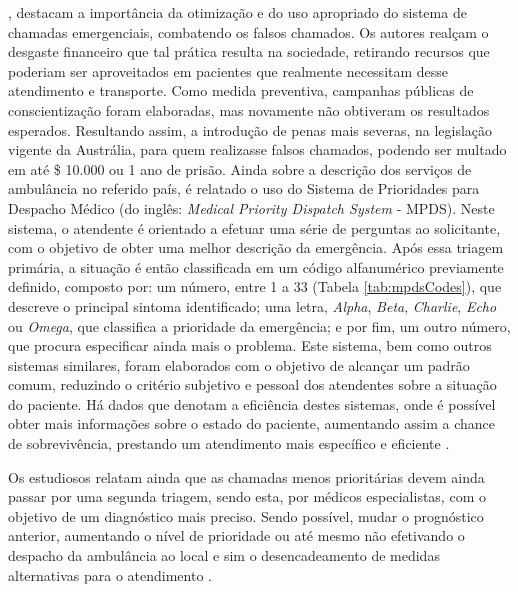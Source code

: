 \cite{rashford2010optimizing}, destacam a importância da otimização e do uso apropriado do sistema de chamadas emergenciais, combatendo os falsos chamados. Os autores realçam o desgaste financeiro que tal prática resulta na sociedade, retirando recursos que poderiam ser aproveitados em pacientes que realmente necessitam desse atendimento e transporte. Como medida preventiva, campanhas públicas de conscientização foram elaboradas, mas novamente não obtiveram os resultados esperados. Resultando assim, a introdução de penas mais severas, na legislação vigente da Austrália,  para quem realizasse falsos chamados, podendo ser multado em até \$ 10.000 ou 1 ano de prisão. 
Ainda sobre a descrição dos serviços de ambulância no referido país, é relatado o uso do Sistema de Prioridades para Despacho Médico (do inglês: \textit{Medical Priority Dispatch System} - MPDS). Neste sistema, o atendente é orientado a efetuar uma série de perguntas ao solicitante, com o objetivo de obter uma melhor descrição da emergência. Após essa triagem primária, a situação é então classificada em um código alfanumérico previamente definido, composto por: um número, entre 1 a 33 (Tabela \ref{tab:mpdsCodes}), que descreve o principal sintoma identificado; uma letra, \textit{Alpha}, \textit{Beta}, \textit{Charlie}, \textit{Echo} ou \textit{Omega}, que classifica a prioridade da emergência; e por fim, um outro número, que procura especificar ainda mais o problema.
Este sistema, bem como outros sistemas similares, foram elaborados com o objetivo de alcançar um padrão comum, reduzindo o critério subjetivo e pessoal dos atendentes sobre a situação do paciente. Há dados que denotam a eficiência destes sistemas, onde é possível obter mais informações sobre o estado do paciente, aumentando assim a chance de sobrevivência, prestando um atendimento mais específico e eficiente \citep{gray2008ampds}.

Os estudiosos relatam ainda que as chamadas menos prioritárias devem ainda passar por uma segunda triagem, sendo esta, por médicos especialistas, com o objetivo de um diagnóstico mais preciso. Sendo possível, mudar o prognóstico anterior, aumentando o nível de prioridade ou até mesmo não efetivando o despacho da ambulância ao local e sim o desencadeamento de medidas alternativas para o atendimento \citep{marks2002emergency, gray2008ampds}.

